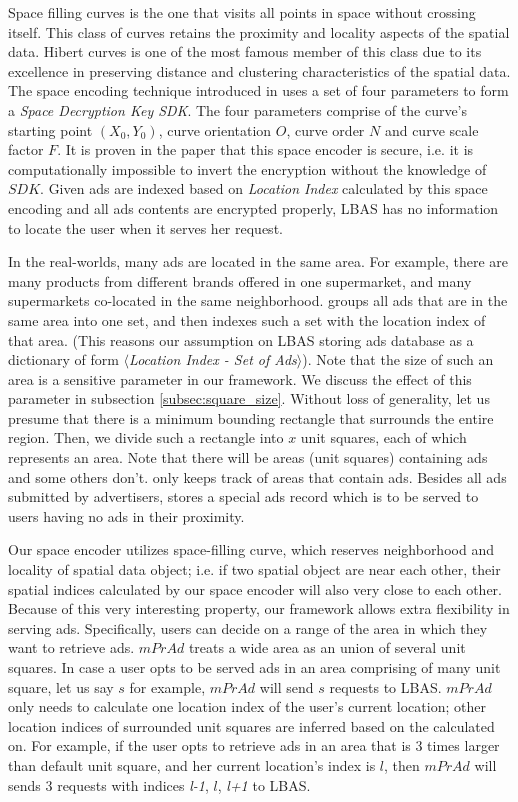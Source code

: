 Space filling curves is the one that visits all points in space without crossing itself. This class of curves retains the proximity and locality aspects of the spatial data. Hibert curves \cite{hibert_curve} is one of the most famous member of this class due to its excellence in preserving distance and clustering characteristics of the spatial data. The space encoding technique introduced in \cite{Space_Transformation} uses a set of four parameters to form a \textit{Space Decryption Key SDK}. The four parameters comprise of the curve's starting point $(X_0, Y_0)$, curve orientation $O$, curve order $N$ and curve scale factor $F$. It is proven in the paper that this space encoder is secure, i.e. it is computationally impossible to invert the encryption without the knowledge of $SDK$. Given ads are indexed based on \textit{Location Index} calculated by this space encoding and all ads contents are encrypted properly, LBAS has no information to locate the user when it serves her request.


In the real-worlds, many ads are located in the same area. For example, there are many products from different brands offered in one supermarket, and many supermarkets co-located in the same neighborhood. \codename groups all ads that are in the same area into one set, and then indexes such a set with the location index of that area. (This reasons our assumption on LBAS storing ads database as a dictionary of form $\langle$\textit{Location Index - Set of Ads}$\rangle$). Note that the size of such an area is a sensitive parameter in our framework. We discuss the effect of this parameter in subsection \ref{subsec:square_size}.
Without loss of generality, let us presume that there is a minimum bounding rectangle that surrounds the entire region. Then, we divide such a rectangle into $x$ unit squares, each of which represents an area. Note that there will be areas (unit squares) containing ads and some others don't. \codename only keeps track of areas that contain ads. Besides all ads submitted by advertisers, \codename stores a special ads record which is to be served to users having no ads in their proximity.

Our space encoder utilizes space-filling curve, which reserves neighborhood and locality of spatial data object; i.e. if two spatial object are near each other, their spatial indices calculated by our space encoder will also very close to each other. Because of this very interesting property, our framework allows extra flexibility in serving ads. Specifically, users can decide on a range of the area in which they want to retrieve ads. $mPrAd$ treats a wide area as an union of several unit squares. In case a user opts to be served ads in an area comprising of many unit square, let us say $s$ for example, $mPrAd$ will send $s$ requests to LBAS. $mPrAd$ only needs to calculate one location index of the user's current location; other location indices of surrounded unit squares are inferred based on the calculated on. For example, if the user opts to retrieve ads in an area that is 3 times larger than default unit square, and her current location's index is $l$, then $mPrAd$ will sends 3 requests with indices \textit{l-1}, $l$, \textit{l+1} to LBAS.



